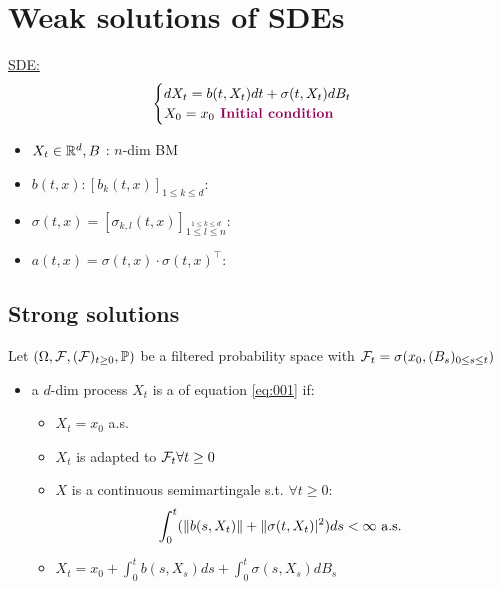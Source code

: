 \chapter{Weak solutions of SDEs}

\underline{SDE:} 
\begin{equation}\label{eq:001}
    \begin{cases}
        dX_t=b(t,X_t)dt+\sigma(t,X_t)dB_t\\
        X_0=x_0 \highlight{ Initial condition}
    \end{cases}
\end{equation}
\begin{itemize}
    \item $X_t\in\mathbb{R}^d,B$ : $n$-dim BM 
    \item $b(t,x): [b_k(t,x)]_{1\leq k\leq d}$: 
    \item $\sigma(t,x)=[\sigma_{k,l}(t,x)]_{\stackrel{1\leq k\leq d}{1\leq l\leq n}}$: 
    \item $a(t,x)=\sigma(t,x)\cdot\sigma(t,x)^\intercal$: 
\end{itemize}

\section{Strong solutions}

\begin{definition}\label{def:strong_solution}
    Let $(\Omega,\mathcal{F},(\mathcal{F})_{t\geq 0},\mathbb{P})$ be a filtered probability space
    with $\mathcal{F}_t=\sigma(x_0,(B_s)_{0\leq s\leq t})$
    \begin{itemize}
        \item a $d$-dim process $X_t$ is a  of equation \ref{eq:001} if: \begin{itemize}
            \item $X_t=x_0$ a.s. 
            \item $X_t$ is adapted to $\mathcal{F}_t\forall t\geq 0$
            \item $X$ is a continuous semimartingale s.t. $\forall t\geq 0$:\[\int_0^t(\Vert b(s,X_t)\Vert+\Vert \sigma(t,X_t)\vert^2)ds <\infty \text{ a.s. }\]
            \item $X_t=x_0+\int_0^t b(s,X_s)ds+\int_0^t\sigma(s,X_s)dB_s$
        \end{itemize}
    \end{itemize}
\end{definition}

